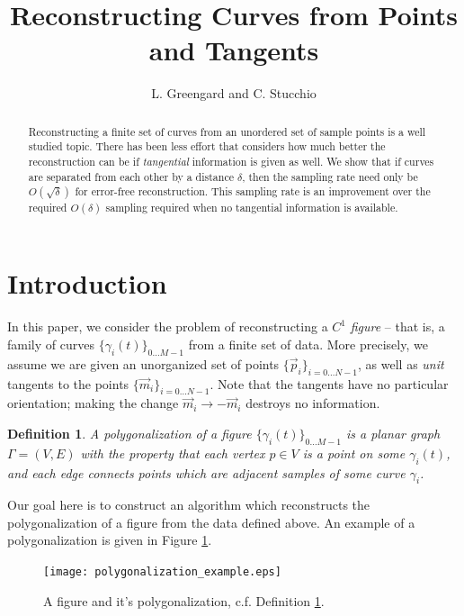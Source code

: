 \documentclass{article}
\newtheorem{definition}[cntr]{Definition}
\numberwithin{cntr}{section}
\numberwithin{equation}{section}
\newcommand{\vp}[0]{{\vec{p}}}
\newcommand{\vm}[0]{{\vec{m}}}
\newcommand{\Oto}[1]{{0 \ldots #1-1}}
\newcommand{\OtoN}{{0 \ldots N-1}}
\newcommand{\pointData}{{ \{ \vp_{i} \}_{i=\OtoN} }}
\newcommand{\tanData}{{ \{ \vm_{i} \}_{i=\OtoN} }}
\newcommand{\curveSet}{{ \{ \gamma_i(t) \}_{\Oto{M}}}}
\newcommand{\curvesep}{{\delta}}
\begin{document}
\title{Reconstructing Curves from Points and Tangents}

\author{L. Greengard and C. Stucchio}

\maketitle

\begin{abstract}
Reconstructing a finite set of curves from an unordered set of sample points
is a well studied topic. There has been less
effort that considers how much better the reconstruction can be if
\emph{tangential} information is given as well.
We show that if curves are separated from each other by a
distance $\curvesep$, then the sampling rate need only be $O(\sqrt{\curvesep})$
for error-free reconstruction. This sampling rate is an improvement over the required $O(\curvesep)$ sampling required when no tangential information is available.
\end{abstract}

\section{Introduction}

In this paper, we consider the problem of reconstructing a
$C^{1}$ \emph{figure} -- that is, a family of curves $\curveSet$ from a finite
set of data. More precisely, we assume we are given
an unorganized set of points $\pointData$, as well as \emph{unit} tangents to the points $\tanData$. Note that the tangents have no particular orientation; making the change $\vm_{i} \rightarrow -\vm_{i}$ destroys no information.

\begin{definition}
  \label{def:polygonalization}
  A polygonalization of a figure $\curveSet$ is a planar graph
$\Gamma = (V,E)$ with the property that each vertex $p \in V$ is a point on some $\gamma_{i}(t)$, and each edge connects points which are adjacent samples of some curve $\gamma_{i}$.
\end{definition}

Our goal here is to construct an algorithm which reconstructs the
polygonalization of a figure from the data defined above.
An example of a polygonalization is given in Figure \ref{fig:polygonalization}.

\begin{figure}
\setlength{\unitlength}{0.240900pt}
\ifx\plotpoint\undefined\newsavebox{\plotpoint}\fi
\sbox{\plotpoint}{\rule[-0.200pt]{0.400pt}{0.400pt}}%
\texttt{[image: polygonalization\_example.eps]}
\caption{A figure and it's polygonalization, c.f. Definition \ref{def:polygonalization}. }
\label{fig:polygonalization}
\end{figure}
\end{document}
